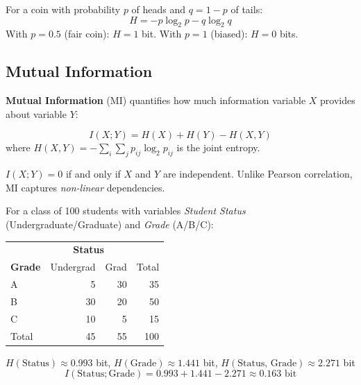 \begin{example}
For a coin with probability $p$ of heads and $q = 1 - p$ of tails:
\[
  H = -p \log_2 p - q \log_2 q
\]
With $p = 0.5$ (fair coin): $H = 1$ bit. With $p = 1$ (biased): $H = 0$ bits.
\end{example}

\subsection{Mutual Information}

\textbf{Mutual Information} (MI) quantifies how much information variable $X$ provides about variable $Y$:

\begin{definition}
\begin{equation}
  I(X; Y) = H(X) + H(Y) - H(X, Y)
  \label{eq:mutual-info}
\end{equation}
where $H(X,Y) = -\sum_i \sum_j p_{ij} \log_2 p_{ij}$ is the joint entropy.
\end{definition}

$I(X;Y) = 0$ if and only if $X$ and $Y$ are independent. Unlike Pearson correlation, MI captures \textit{non-linear} dependencies.

\begin{example}
For a class of 100 students with variables \textit{Student Status} (Undergraduate/Graduate) and \textit{Grade} (A/B/C):

\begin{center}
\small
\begin{tabularx}{0.85\linewidth}{l r r r}
\toprule
& \multicolumn{2}{c}{\textbf{Status}} & \\
\textbf{Grade} & Undergrad & Grad & Total \\
\midrule
A & 5 & 30 & 35 \\
B & 30 & 20 & 50 \\
C & 10 & 5  & 15 \\
\midrule
Total & 45 & 55 & 100 \\
\bottomrule
\end{tabularx}
\end{center}

$H(\text{Status}) \approx 0.993$ bit, \quad $H(\text{Grade}) \approx 1.441$ bit, \quad $H(\text{Status, Grade}) \approx 2.271$ bit
\[
  I(\text{Status}; \text{Grade}) = 0.993 + 1.441 - 2.271 \approx \mathbf{0.163} \text{ bit}
\]
\end{example}


